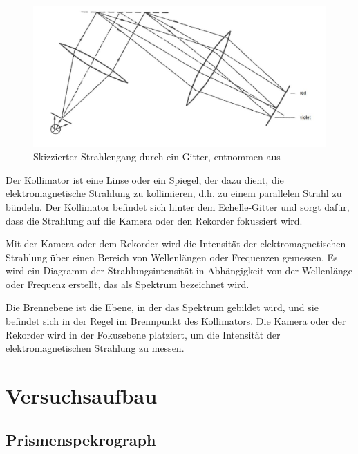 \documentclass[12pt,english,ngerman]{scrartcl}
\begin{document}
\begin{figure}[H]
	\begin{center}
		\includegraphics[width =\textwidth]{./figures/skizze_gitter.png}
	\end{center}
	\caption[Skizzierter Strahlengang durch ein Gitter] {Skizzierter Strahlengang durch ein
		Gitter, entnommen aus~\cite{unterlagen}
	}\label{fig:gitter}
\end{figure}

Der Kollimator ist eine Linse oder ein Spiegel, der dazu dient, die
elektromagnetische Strahlung zu kollimieren, d.h. zu einem parallelen Strahl zu
bündeln. Der Kollimator befindet sich hinter dem Echelle-Gitter und sorgt
dafür, dass die Strahlung auf die Kamera oder den Rekorder fokussiert wird.

Mit der Kamera oder dem Rekorder wird die Intensität der elektromagnetischen
Strahlung über einen Bereich von Wellenlängen oder Frequenzen gemessen. Es wird
ein Diagramm der Strahlungsintensität in Abhängigkeit von der Wellenlänge oder
Frequenz erstellt, das als Spektrum bezeichnet wird.

Die Brennebene ist die Ebene, in der das Spektrum gebildet wird, und sie
befindet sich in der Regel im Brennpunkt des Kollimators. Die Kamera oder der
Rekorder wird in der Fokusebene platziert, um die Intensität der
elektromagnetischen Strahlung zu messen.


\section{Versuchsaufbau}\label{sec:aufbau}

\subsection{Prismenspekrograph}
\end{document}
